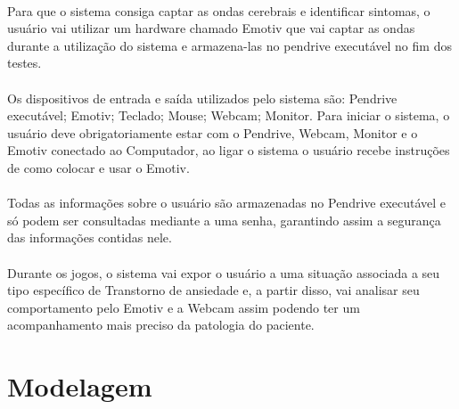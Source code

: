 \documentclass[12pt]{article}
\begin{document}
\paragraph{}Para que o sistema consiga captar as ondas cerebrais e identificar sintomas, o usuário vai utilizar um hardware chamado Emotiv que vai captar as ondas  durante a utilização do sistema e armazena-las no pendrive executável no fim dos testes.
\paragraph{}Os dispositivos de entrada e saída utilizados pelo sistema são: Pendrive executável; Emotiv; Teclado; Mouse; Webcam; Monitor. Para iniciar o sistema, o usuário deve obrigatoriamente estar com o Pendrive, Webcam, Monitor e o Emotiv conectado ao Computador, ao ligar o sistema o usuário recebe instruções de como colocar e usar o Emotiv.
\paragraph{}Todas as informações sobre o usuário são armazenadas no Pendrive executável e só podem ser consultadas mediante a uma senha, garantindo assim a segurança das informações contidas nele.
\paragraph{}Durante os jogos, o sistema vai expor o usuário a uma situação associada a seu tipo específico de Transtorno de ansiedade e, a partir disso, vai analisar seu comportamento pelo Emotiv e a Webcam assim podendo ter um acompanhamento mais preciso da patologia do paciente.



\section{Modelagem} \label{sec:firstpage}
\end{document}
